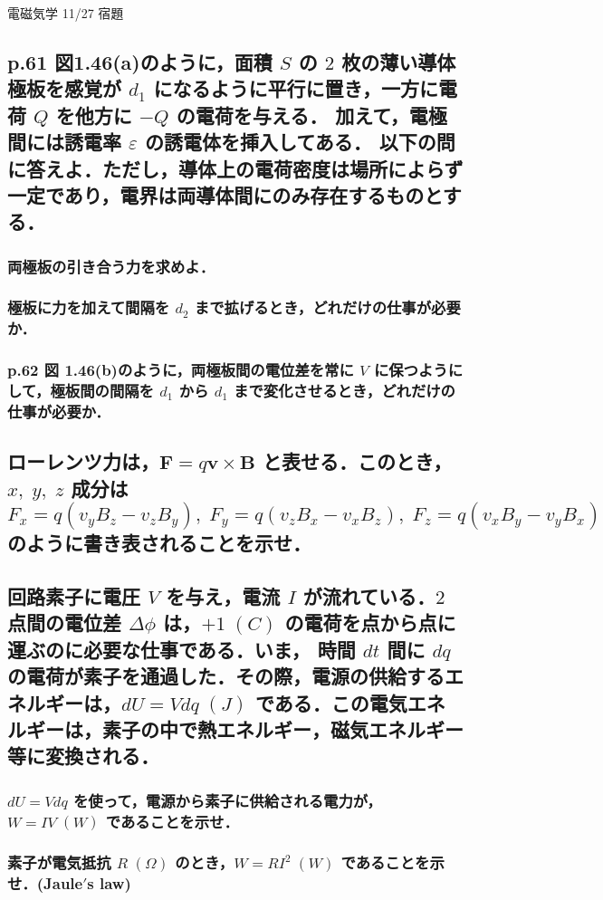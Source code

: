 \documentclass[a4paper, 12pt]{bxjsarticle}
\begin{document}
\begin{center}
    \begin{huge}
        電磁気学 11/27 宿題
    \end{huge}
\end{center}

\begin{samepage}
\subsection{p.61 図1.46(a)のように，面積 \(S\) の \(2\) 枚の薄い導体極板を感覚が \(d_1\) になるように平行に置き，一方に電荷 \(Q\) を他方に \(-Q\) の電荷を与える．%
加えて，電極間には誘電率 \(\varepsilon\) の誘電体を挿入してある．%
以下の問に答えよ．ただし，導体上の電荷密度は場所によらず一定であり，電界は両導体間にのみ存在するものとする．}
\subsubsection{両極板の引き合う力を求めよ．}
\vspace{13em}
\subsubsection{極板に力を加えて間隔を \(d_2\) まで拡げるとき，どれだけの仕事が必要か．}
\vspace{13em}
\subsubsection{p.62 図 1.46(b)のように，両極板間の電位差を常に \(V\) に保つようにして，極板間の間隔を \(d_1\) から \(d_1\) まで変化させるとき，どれだけの仕事が必要か．}
\end{samepage}

\newpage
\subsection{ローレンツ力は，\(\boldsymbol{F}=q\boldsymbol{v}\times\boldsymbol{B}\) と表せる．このとき，\(x,\;y,\;z\) 成分は\[%
    F_x=q(v_yB_z-v_zB_y),\;F_y=q(v_zB_x-v_xB_z),\;F_z=q(v_xB_y-v_yB_x)\]のように書き表されることを示せ．}
\newpage

\subsection{回路素子に電圧 \(V\) を与え，電流 \(I\) が流れている．\(2\) 点間の電位差 \(\Delta \phi\) は，\(+1\;\si{(C)}\) の電荷を点から点に運ぶのに必要な仕事である．いま，%
時間 \(dt\) 間に \(dq\) の電荷が素子を通過した．その際，電源の供給するエネルギーは，\(dU = Vdq\;\si{(J)}\) である．この電気エネルギーは，素子の中で熱エネルギー，磁気エネルギー%
等に変換される．}
\subsubsection{\(dU=Vdq\) を使って，電源から素子に供給される電力が，\(W=IV\;\si{(W)}\) であることを示せ．}
\vspace{20em}
\subsubsection{素子が電気抵抗 \(R\;\si{(\Omega)}\) のとき，\(W=RI^2\;\si{(W)}\) であることを示せ．(Jaule\('\)s law)}
\end{document}
